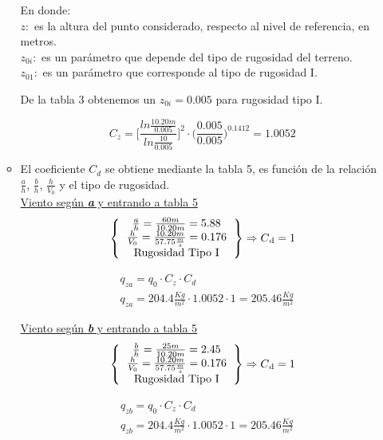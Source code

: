 \begin{enumerate}
\begin{itemize}
En donde:\\
$z:$ es la altura del punto considerado, respecto al nivel de referencia, en metros.\\
$z_{0i}:$ es un parámetro que depende del tipo de rugosidad del terreno.\\
$z_{01}:$ es un parámetro que corresponde al tipo de rugosidad I.\\

\newpage

De la tabla 3 obtenemos un $z_{0i}=0.005$ para rugosidad tipo I.

$$C_z= \Bigg[\frac{ln\frac{10.20m}{0.005}} {ln\frac{10}{0.005}}\Bigg]^2 \cdot \Bigg(\frac{0.005}{0.005}\Bigg)^{0.1412} = 1.0052$$

\item El coeficiente $C_d$ se obtiene mediante la tabla 5, es función de la relación $\frac{a}{h}$, $\frac{b}{h}$, $\frac{h}{V_0}$ y el tipo de rugosidad.\\

\underline{Viento según \emph{\textbf{a}} y entrando a tabla 5}
\[ 
\left \{
  \begin{tabular}{ccc}
  $\frac{a}{h} = \frac{60m}{10.20m} = 5.88$ \\
  $\frac{h}{V_0} = \frac{10.20m}{57.75 \frac{m}{s}} = 0.176$ \\
  Rugosidad Tipo I
  \end{tabular}
\right \} \Rightarrow C\textsubscript{d} = 1
\]

\begin{align*}
& q_{za}= q_0 \cdot C_z \cdot C_d \\
& q_{za}= 204.4 \frac{Kg}{m^2} \cdot 1.0052 \cdot 1 = 205.46 \frac{Kg}{m^2}
\end{align*}

\underline{Viento según \emph{\textbf{b}} y entrando a tabla 5}
\[ 
\left \{
  \begin{tabular}{ccc}
  $\frac{b}{h} = \frac{25m}{10.20m} = 2.45$ \\
  $\frac{h}{V_0} = \frac{10.20m}{57.75 \frac{m}{s}} = 0.176$ \\
  Rugosidad Tipo I
  \end{tabular}
\right \} \Rightarrow C\textsubscript{d} = 1
\]

\begin{align*}
& q_{zb}= q_0 \cdot C_z \cdot C_d \\
& q_{zb}= 204.4 \frac{Kg}{m^2} \cdot 1.0052 \cdot 1 = 205.46 \frac{Kg}{m^2}
\end{align*}


\end{itemize}
\end{enumerate}
